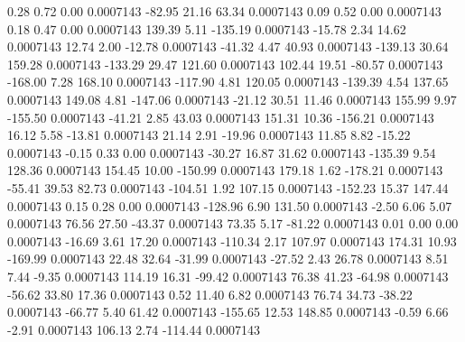         0.28        0.72        0.00     0.0007143
      -82.95       21.16       63.34     0.0007143
        0.09        0.52        0.00     0.0007143
        0.18        0.47        0.00     0.0007143
      139.39        5.11     -135.19     0.0007143
      -15.78        2.34       14.62     0.0007143
       12.74        2.00      -12.78     0.0007143
      -41.32        4.47       40.93     0.0007143
     -139.13       30.64      159.28     0.0007143
     -133.29       29.47      121.60     0.0007143
      102.44       19.51      -80.57     0.0007143
     -168.00        7.28      168.10     0.0007143
     -117.90        4.81      120.05     0.0007143
     -139.39        4.54      137.65     0.0007143
      149.08        4.81     -147.06     0.0007143
      -21.12       30.51       11.46     0.0007143
      155.99        9.97     -155.50     0.0007143
      -41.21        2.85       43.03     0.0007143
      151.31       10.36     -156.21     0.0007143
       16.12        5.58      -13.81     0.0007143
       21.14        2.91      -19.96     0.0007143
       11.85        8.82      -15.22     0.0007143
       -0.15        0.33        0.00     0.0007143
      -30.27       16.87       31.62     0.0007143
     -135.39        9.54      128.36     0.0007143
      154.45       10.00     -150.99     0.0007143
      179.18        1.62     -178.21     0.0007143
      -55.41       39.53       82.73     0.0007143
     -104.51        1.92      107.15     0.0007143
     -152.23       15.37      147.44     0.0007143
        0.15        0.28        0.00     0.0007143
     -128.96        6.90      131.50     0.0007143
       -2.50        6.06        5.07     0.0007143
       76.56       27.50      -43.37     0.0007143
       73.35        5.17      -81.22     0.0007143
        0.01        0.00        0.00     0.0007143
      -16.69        3.61       17.20     0.0007143
     -110.34        2.17      107.97     0.0007143
      174.31       10.93     -169.99     0.0007143
       22.48       32.64      -31.99     0.0007143
      -27.52        2.43       26.78     0.0007143
        8.51        7.44       -9.35     0.0007143
      114.19       16.31      -99.42     0.0007143
       76.38       41.23      -64.98     0.0007143
      -56.62       33.80       17.36     0.0007143
        0.52       11.40        6.82     0.0007143
       76.74       34.73      -38.22     0.0007143
      -66.77        5.40       61.42     0.0007143
     -155.65       12.53      148.85     0.0007143
       -0.59        6.66       -2.91     0.0007143
      106.13        2.74     -114.44     0.0007143
